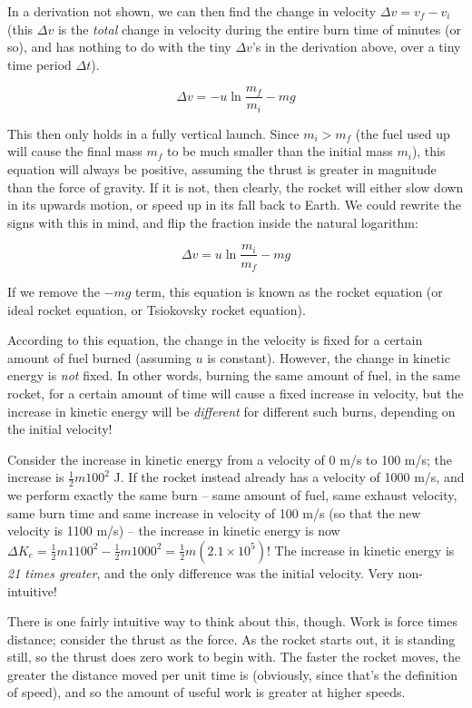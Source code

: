 In a derivation not shown, we can then find the change in velocity $\Delta v = v_f - v_i$ (this $\Delta v$ is the \emph{total} change in velocity during the entire burn time of minutes (or so), and has nothing to do with the tiny $\Delta v$'s in the derivation above, over a tiny time period $\Delta t$).

\begin{equation}
\Delta v = -u \ln \frac{m_f}{m_i} - m g
\end{equation}

This then only holds in a fully vertical launch. Since $m_i > m_f$ (the fuel used up will cause the final mass $m_f$ to be much smaller than the initial mass $m_i$), this equation will always be positive, assuming the thrust is greater in magnitude than the force of gravity. If it is not, then clearly, the rocket will either slow down in its upwards motion, or speed up in its fall back to Earth. We could rewrite the signs with this in mind, and flip the fraction inside the natural logarithm:

\begin{equation}
\Delta v = u \ln \frac{m_i}{m_f} - m g
\end{equation}

If we remove the $- m g$ term, this equation is known as the rocket equation (or ideal rocket equation, or Tsiokovsky rocket equation).

According to this equation, the change in the velocity is fixed for a certain amount of fuel burned (assuming $u$ is constant). However, the change in kinetic energy is \emph{not} fixed. In other words, burning the same amount of fuel, in the same rocket, for a certain amount of time will cause a fixed increase in velocity, but the increase in kinetic energy will be \emph{different} for different such burns, depending on the initial velocity!

Consider the increase in kinetic energy from a velocity of 0 m/s to 100 m/s; the increase is $\frac{1}{2} m 100^2$ J. If the rocket instead already has a velocity of 1000 m/s, and we perform exactly the same burn -- same amount of fuel, same exhaust velocity, same burn time and same increase in velocity of 100 m/s (so that the new velocity is 1100 m/s) -- the increase in kinetic energy is now $\Delta K_e = \frac{1}{2} m 1100^2 - \frac{1}{2} m 1000^2 = \frac{1}{2} m (2.1 \times 10^5)$! The increase in kinetic energy is \emph{21 times greater}, and the only difference was the initial velocity. Very non-intuitive!

There is one fairly intuitive way to think about this, though. Work is force times distance; consider the thrust as the force. As the rocket starts out, it is standing still, so the thrust does zero work to begin with. The faster the rocket moves, the greater the distance moved per unit time is (obviously, since that's the definition of speed), and so the amount of useful work is greater at higher speeds.
